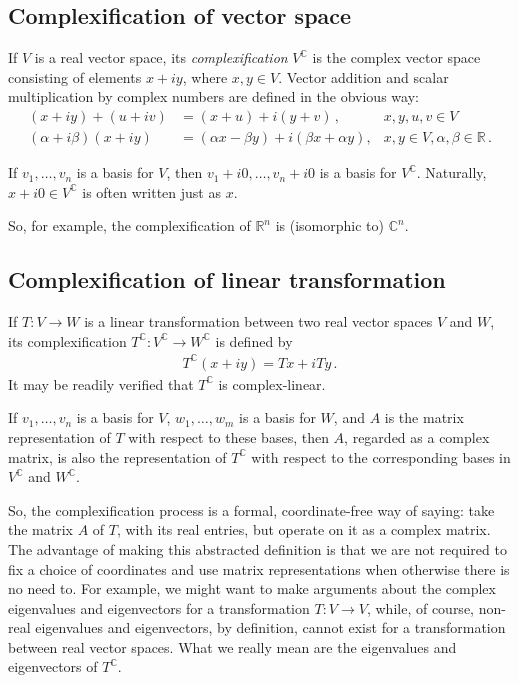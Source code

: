 \documentclass[12pt]{article}
\newcommand{\real}{\mathbb{R}}
\newcommand{\complex}{\mathbb{C}}
\newcommand{\Vc}{V^\mathbb{C}}
\newcommand{\Wc}{W^\mathbb{C}}
\newcommand{\Tc}{T^\mathbb{C}}
\providecommand{\defnterm}[1]{\emph{#1}}
\begin{document}

\subsection{Complexification of vector space}

If $V$ is a real vector space,
its \defnterm{complexification} $\Vc$
is the complex vector space consisting of elements $x + iy$, where $x, y \in V$. Vector addition and scalar multiplication by complex numbers
are defined in the obvious way:
\begin{align*}
(x + iy) + (u+iv) &= (x+u) + i(y+v)\,, & x, y, u, v \in V \\
(\alpha + i\beta) (x+iy) &= (\alpha x - \beta y) + i(\beta x + \alpha y), & x, y \in V, \alpha, \beta \in \real\,.
\end{align*}

If $v_1, \dotsc, v_n$ is a basis for $V$, then $v_1 + i0, \dotsc, v_n + i0$
is a basis for $\Vc$.  Naturally, $x + i0 \in \Vc$ is often written just as $x$.

So, for example, the complexification of $\real^n$ is (isomorphic to) $\complex^n$.

\subsection{Complexification of linear transformation}

If $T\colon V \to W$ is a linear transformation between two real vector spaces $V$ and $W$,
its complexification $\Tc\colon \Vc \to \Wc$
is defined by
\begin{align*}
\Tc (x+iy) = Tx + iTy\,.
\end{align*}
It may be readily verified that $\Tc$ is complex-linear.

If $v_1, \dotsc, v_n$ is a basis for $V$, $w_1, \dotsc, w_m$ is a basis for $W$,
and $A$ is the matrix representation of $T$ with respect to these bases,
then $A$, regarded as a complex matrix,
is also the representation of $\Tc$ with respect to the corresponding bases
in $\Vc$ and $\Wc$.

So, the complexification process is a formal, coordinate-free way of saying: 
take the matrix $A$ of $T$, with its real entries,
but operate on it as a complex matrix.  The advantage of making this abstracted definition is that
we are not required to fix a choice of coordinates and use matrix representations
when otherwise there is no need to.
For example, we might want to make arguments about the complex eigenvalues
and eigenvectors for a transformation $T\colon V \to V$, while,
of course, non-real eigenvalues and eigenvectors, by definition, cannot exist
for a transformation between real vector spaces.
What we really mean are the eigenvalues and eigenvectors of $\Tc$.
\end{document}
